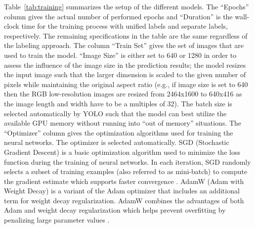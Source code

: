 \documentclass[Master,MDS,english]{BASE/twbook} %
\begin{document}
Table~\ref{tab:training} summarizes the setup of the different models. 
The ``Epochs'' column gives the actual number of performed epochs and ``Duration'' is the wall-clock time for the training process with unified labels and separate labels, respectively. The remaining specifications in the table are the same regardless of the labeling approach. 
The column ``Train Set'' gives the set of images that are used to train the model. ``Image Size'' is either set to 640 or 1280 in order to assess the influence of the image size in the prediction results; the model resizes the input image such that the larger dimension is scaled to the given number of pixels while maintaining the original aspect ratio (e.g., if image size is set to 640 then the RGB low-resolution images are resized from 2464x1600 to 640x416 as the image length and width have to be a multiples of 32).
The batch size is selected automatically by YOLO such that the model can best utilize the available GPU memory without running into ``out of memory'' situations. The ``Optimizer'' column gives the optimization algorithms used for training the neural networks. The optimizer is selected automatically.  SGD (Stochastic Gradient Descent) is a basic optimization algorithm used to minimize the loss function during the training of neural networks. In each iteration, SGD randomly selects a subset of training examples (also referred to as mini-batch) to compute the gradient estimate which supports faster convergence \citep{bottou2010large}. AdamW (Adam with Weight Decay) is a variant of the Adam optimizer that includes an additional term for weight decay regularization. AdamW combines the advantages of both Adam and weight decay regularization which helps prevent overfitting by penalizing large parameter values \citep{kingma2014adam}. 
 
\end{document}
